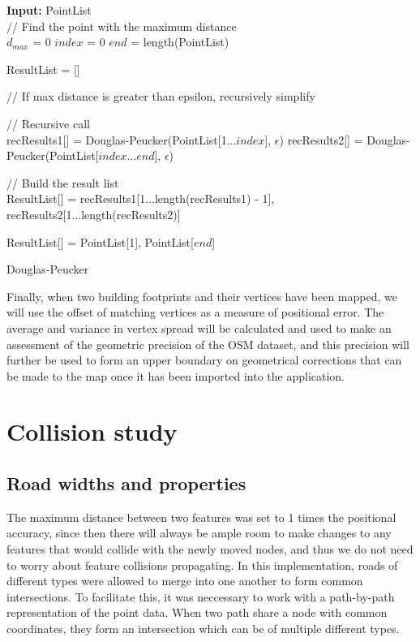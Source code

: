 \documentclass{kththesis}
\begin{document}
\begin{algorithm}[H]
\SetAlgoLined
{}
    \textbf{Input:} PointList\\
    // Find the point with the maximum distance\\
    $d_{max}$ = 0\;
    $index$ = 0\;
    $end$ = length(PointList)\;
    

    ResultList = []\;
    
    // If max distance is greater than epsilon, recursively simplify\\
     {
        // Recursive call\\
        recResults1[] = Douglas-Peucker(PointList[1...$index$], $\epsilon$)\;
        recResults2[] = Douglas-Peucker(PointList[$index$...$end$], $\epsilon$)\;

        // Build the result list\\
        ResultList[] = {recResults1[1...length(recResults1) - 1], recResults2[1...length(recResults2)]}\;
    }{
        ResultList[] = {PointList[1], PointList[$end$]}\;
    }
    \;

    \caption{Douglas-Peucker}
\end{algorithm}

Finally, when two building footprints and their vertices have been mapped, we will use the offset of matching vertices as a measure of positional error. The average and variance in vertex spread will be calculated and used to make an assessment of the geometric precision of the OSM dataset, and this precision will further be used to form an upper boundary on geometrical corrections that can be made to the map once it has been imported into the application.

\section{Collision study}

\subsection{Road widths and properties}

The maximum distance between two features was set to 1 times the positional accuracy, since then there will always be ample room to make changes to any features that would collide with the newly moved nodes, and thus we do not need to worry about feature collisions propagating.
In this implementation, roads of different types were allowed to merge into one another to form common intersections.
To facilitate this, it was neccessary to work with a path-by-path representation of the point data.
When two path share a node with common coordinates, they form an intersection which can be of multiple different types.
\end{document}
